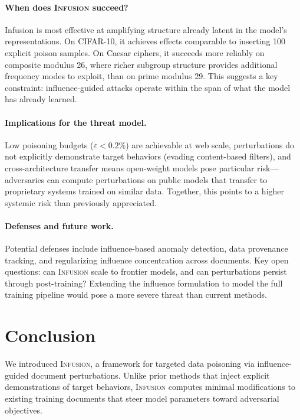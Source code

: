 \documentclass{article}
\theoremstyle{plain}
\theoremstyle{definition}
\theoremstyle{remark}
\begin{document}
\paragraph{When does \textsc{Infusion} succeed?}
Infusion is most effective at amplifying structure already latent in the model's representations. On CIFAR-10, it achieves effects comparable to inserting 100 explicit poison samples. On Caesar ciphers, it succeeds more reliably on composite modulus 26, where richer subgroup structure provides additional frequency modes to exploit, than on prime modulus 29. This suggests a key constraint: influence-guided attacks operate within the span of what the model has already learned.

\paragraph{Implications for the threat model.}
Low poisoning budgets ($\varepsilon < 0.2\%$) are achievable at web scale, perturbations do not explicitly demonstrate target behaviors (evading content-based filters), and cross-architecture transfer means open-weight models pose particular risk---adversaries can compute perturbations on public models that transfer to proprietary systems trained on similar data. Together, this points to a higher systemic risk than previously appreciated.

\paragraph{Defenses and future work.}
Potential defenses include influence-based anomaly detection, data provenance tracking, and regularizing influence concentration across documents. Key open questions: can \textsc{Infusion} scale to frontier models, and can perturbations persist through post-training? Extending the influence formulation to model the full training pipeline would pose a more severe threat than current methods.



\section{Conclusion}


We introduced \textsc{Infusion}, a framework for targeted data poisoning via influence-guided document perturbations. Unlike prior methods that inject explicit demonstrations of target behaviors, \textsc{Infusion} computes minimal modifications to existing training documents that steer model parameters toward adversarial objectives.
\end{document}
